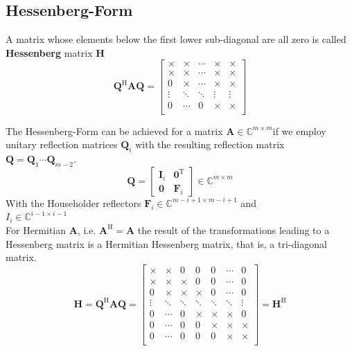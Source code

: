 \documentclass[english]{latex4ei/latex4ei_sheet}
\begin{document}
\begin{sectionbox}
\subsection{Hessenberg-Form}
A matrix whose elements below the first lower sub-diagonal are all zero is called \textbf{Hessenberg} matrix $\mathbf{H}$
$$\mathbf{Q}^\text{H}\mathbf{A}\mathbf{Q} = \begin{bmatrix}
\times & \times & \cdots & \times & \times \\
\times & \times & \cdots & \times & \times \\
0 & \times & \cdots & \times & \times \\
\vdots & \ddots & \ddots & \vdots & \vdots \\
0 & \cdots & 0 & \times & \times \\
\end{bmatrix}$$

The Hessenberg-Form can be achieved for a matrix $\mathbf{A}\in\mathbb{C}^{m\times m}$if we employ unitary reflection matrices $\mathbf{Q}_i$ with the resulting reflection matrix $\mathbf{Q}=\mathbf{Q}_1\cdots\mathbf{Q}_{m-2}$.
$$\mathbf{Q} = \begin{bmatrix}
\mathbf{I}_i & \mathbf{0}^\text{T}\\
\mathbf{0} & \mathbf{F}_i
\end{bmatrix} \in \mathbb{C}^{m\times m}$$
With the Householder reflectors $\mathbf{F}_i\in\mathbb{C}^{m-i+1\times m-i+1}$ and\\
$I_i\in\mathbb{C}^{i-1\times i-1}$\\

For Hermitian $\mathbf{A}$, i.e. $\mathbf{A}^\text{H}=\mathbf{A}$ the result of the transformations leading to a Hessenberg matrix is a Hermitian Hessenberg matrix, that is, a tri-diagonal matrix.
$$\mathbf{H} = \mathbf{Q}^\text{H} \mathbf{A}\mathbf{Q}=
\begin{bmatrix}
\times & \times & 0 & 0 & 0 &\cdots & 0 \\
\times & \times & \times & 0 & 0 &\cdots & 0 \\
0 & \times & \times & \times & 0 &\cdots & 0 \\
\vdots & \ddots & \ddots & \ddots & \ddots & \ddots & \vdots \\
0 & \cdots & 0 & \times & \times &\times & 0 \\
0 & \cdots & 0 & 0 & \times &\times & \times \\
0 & \cdots & 0 & 0 & 0 &\times & \times \\
\end{bmatrix} = \mathbf{H}^\text{H}$$
\end{sectionbox}
\end{document}
